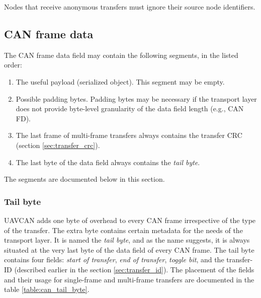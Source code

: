 Nodes that receive anonymous transfers must ignore their source node identifiers.

\subsection{CAN frame data}

The CAN frame data field may contain the following segments, in the listed order:
\begin{samepage}
\begin{enumerate}
    \item The useful payload (serialized object). This segment may be empty.
    \item Possible padding bytes.
          Padding bytes may be necessary if the transport layer does not provide byte-level
          granularity of the data field length (e.g., CAN FD).
    \item The last frame of multi-frame transfers always contains the transfer CRC (section \ref{sec:transfer_crc}).
    \item The last byte of the data field always contains the \emph{tail byte}.
\end{enumerate}
\end{samepage}
The segments are documented below in this section.

\subsubsection{Tail byte}

UAVCAN adds one byte of overhead to every CAN frame irrespective of the type of the transfer.
The extra byte contains certain metadata for the needs of the transport layer.
It is named the \emph{tail byte}, and as the name suggests, it is always situated
at the very last byte of the data field of every CAN frame.
The tail byte contains four fields: \emph{start of transfer}, \emph{end of transfer},
\emph{toggle bit}, and the transfer-ID (described earlier in the section \ref{sec:transfer_id}).
The placement of the fields and their usage for single-frame and multi-frame transfers
are documented in the table \ref{table:can_tail_byte}.

